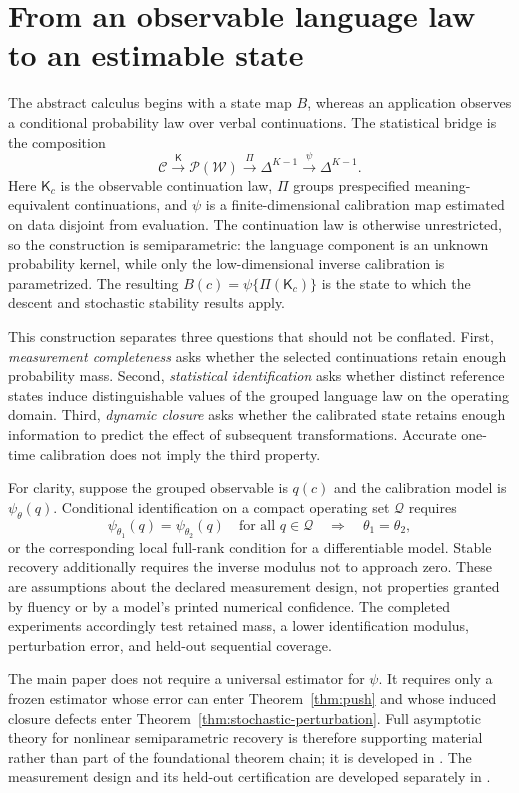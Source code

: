 \documentclass[11pt]{article}
\newcommand{\Prob}{\mathcal P}
\newcommand{\Ctxt}{\mathcal C}
\newcommand{\Words}{\mathcal W}
\newcommand{\Kern}{\mathsf K}
\begin{document}
\section{From an observable language law to an estimable state}

The abstract calculus begins with a state map $B$, whereas an application
observes a conditional probability law over verbal continuations.  The
statistical bridge is the composition
\[
 \Ctxt
 \xrightarrow{\;\Kern\;}
 \Prob(\Words)
 \xrightarrow{\;\Pi\;}
 \Delta^{K-1}
 \xrightarrow{\;\psi\;}
 \Delta^{K-1}.
\]
Here $\Kern_c$ is the observable continuation law, $\Pi$ groups prespecified
meaning-equivalent continuations, and $\psi$ is a finite-dimensional
calibration map estimated on data disjoint from evaluation.  The continuation
law is otherwise unrestricted, so the construction is semiparametric: the
language component is an unknown probability kernel, while only the
low-dimensional inverse calibration is parametrized.  The resulting
$B(c)=\psi\{\Pi(\Kern_c)\}$ is the state to which the descent and stochastic
stability results apply.

This construction separates three questions that should not be conflated.
First, \emph{measurement completeness} asks whether the selected
continuations retain enough probability mass.  Second, \emph{statistical
identification} asks whether distinct reference states induce distinguishable
values of the grouped language law on the operating domain.  Third,
\emph{dynamic closure} asks whether the calibrated state retains enough
information to predict the effect of subsequent transformations.  Accurate
one-time calibration does not imply the third property.

For clarity, suppose the grouped observable is $q(c)$ and the calibration
model is $\psi_\theta(q)$.  Conditional identification on a compact operating
set $\mathcal Q$ requires
\[
 \psi_{\theta_1}(q)=\psi_{\theta_2}(q)
 \quad\text{for all }q\in\mathcal Q
 \quad\Longrightarrow\quad
 \theta_1=\theta_2,
\]
or the corresponding local full-rank condition for a differentiable model.
Stable recovery additionally requires the inverse modulus not to approach
zero.  These are assumptions about the declared measurement design, not
properties granted by fluency or by a model's printed numerical confidence.
The completed experiments accordingly test retained mass, a lower
identification modulus, perturbation error, and held-out sequential coverage.

The main paper does not require a universal estimator for $\psi$.  It requires
only a frozen estimator whose error can enter Theorem~\ref{thm:push} and whose
induced closure defects enter Theorem~\ref{thm:stochastic-perturbation}.
Full asymptotic theory for nonlinear semiparametric recovery is therefore
supporting material rather than part of the foundational theorem chain; it is
developed in \cite{dixon2026semanticobservation}.  The measurement design and
its held-out certification are developed separately in
\cite{dixon2026}.
\end{document}
